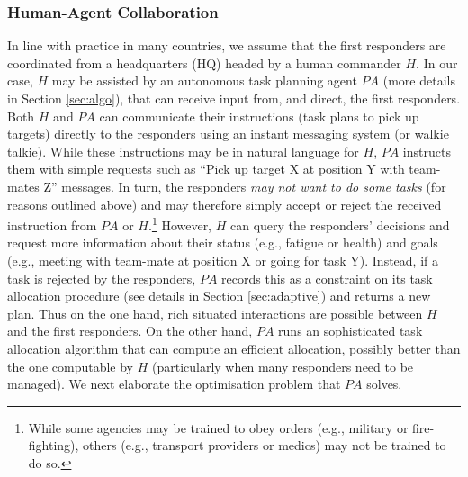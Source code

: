 %
\subsubsection{Human-Agent Collaboration}
\noindent In line with practice in many countries, we assume that the first responders are coordinated from a headquarters (HQ) headed by a human commander $H$. In our case, $H$ may be assisted by an autonomous task planning agent $PA$ (more details in Section \ref{sec:algo}), that can receive input from, and direct, the first responders.   Both  $H$ and $PA$  can communicate their  instructions (task plans to pick up targets) directly to the responders using an instant messaging system (or walkie talkie).  While these instructions may be in natural language for $H$, $PA$ instructs them with simple requests such as ``Pick up target X at position Y with team-mates Z'' messages. In turn, the responders \emph{may not want to do some tasks} (for reasons outlined above) and may therefore simply accept or reject the received instruction from $PA$ or $H$.\footnote{While some agencies may be trained to obey orders (e.g., military or fire-fighting), others (e.g., transport providers or medics) may not be trained to do so.} However, $H$ can query the responders' decisions and request  more information about their status (e.g., fatigue or health) and goals (e.g., meeting with team-mate at position X or going for task Y). Instead, if a task is rejected by the responders, $PA$ records this as a constraint on its task allocation procedure (see details in Section \ref{sec:adaptive}) and returns a new plan. Thus on the one hand, rich situated interactions are possible between $H$ and the first responders. On the other hand, $PA$ runs an sophisticated task allocation algorithm that can compute an efficient allocation, possibly better than the one computable by $H$ (particularly when many responders need to be managed). We next elaborate the optimisation problem that $PA$ solves.

